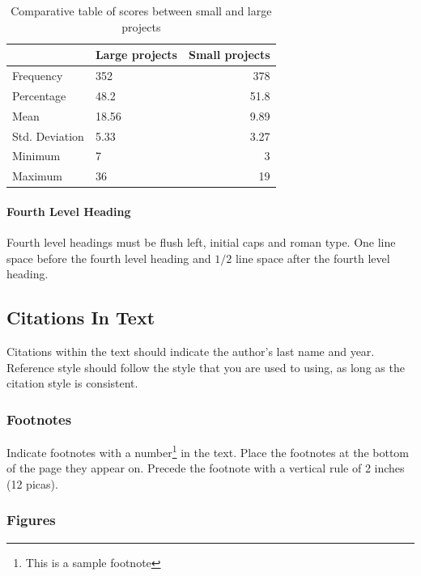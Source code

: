 \documentclass[a4paper]{article}
\begin{document}
\begin{table}[ht]
\begin{center}
\caption{Comparative table of scores between small and large projects}

\bigskip

\begin{tabular}{|l|l|r|}
\hline
& Large projects & Small projects \\ \hline
Frequency & 352 & 378\\ \hline
Percentage & 48.2 & 51.8\\ \hline
Mean & 18.56 & 9.89\\ \hline
Std. Deviation & 5.33 & 3.27\\ \hline
Minimum & 7 & 3\\ \hline
Maximum & 36 & 19\\ \hline
\end{tabular}
\end{center}
\end{table}



\paragraph{Fourth Level Heading}

Fourth level headings must be flush left, initial caps and roman type.
One line space before the fourth level heading and $1/2$ line
space after the fourth level heading.

\subsection{Citations In Text}

Citations within the text should indicate the author's last name and
year\cite{Knuth-vol3}. Reference style\cite{Comer-btree}
should follow the style that you are used to using, as long as the
citation style is consistent.

\subsubsection{Footnotes}

Indicate footnotes with a number\footnote{This is a sample footnote} in
the text. Place the footnotes at the bottom of the page they appear on.
Precede the footnote with a vertical rule of 2 inches (12 picas).

\subsubsection{Figures}
\end{document}
